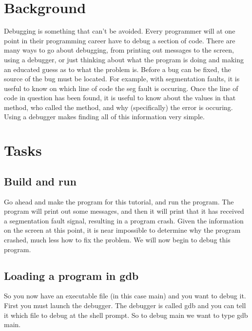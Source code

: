 \section{Background}
Debugging is something that can't be avoided. Every programmer will at one point in their programming career have to debug a section of code. There are many ways to go about debugging, from printing out messages to the screen, using a debugger, or just thinking about what the program is doing and making an educated guess as to what the problem is.
Before a bug can be fixed, the source of the bug must be located. For example, with segmentation faults, it is useful to know on which line of code the seg fault is occuring. Once the line of code in question has been found, it is useful to know about the values in that method, who called the method, and why (specifically) the error is occuring. Using a debugger makes finding all of this information very simple.

\section{Tasks}
\subsection{Build and run}
Go ahead and make the program for this tutorial, and run the program. The program will print out some messages, and then it will print that it has received a segmentation fault signal, resulting in a program crash. Given the information on the screen at this point, it is near impossible to determine why the program crashed, much less how to fix the problem. We will now begin to debug this program.

\subsection{Loading a program in gdb}
So you now have an executable file (in this case main) and you want to debug it. First you must launch the debugger. The debugger is called gdb and you can tell it which file to debug at the shell prompt. So to debug main we want to type gdb main. 

